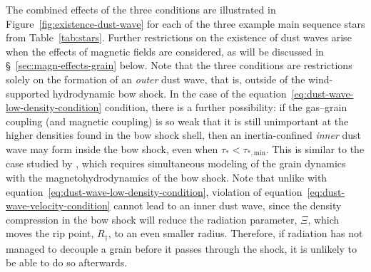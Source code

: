The combined effects of the three conditions are illustrated in
Figure~\ref{fig:existence-dust-wave} for each of the three example
main sequence stars from Table~\ref{tab:stars}.  Further restrictions
on the existence of dust waves arise when the effects of magnetic
fields are considered, as will be discussed in
\S~\ref{sec:magn-effects-grain} below.  Note that the three conditions
are restrictions solely on the formation of an \textit{outer} dust
wave, that is, outside of the wind-supported hydrodynamic bow shock.
In the case of the equation~\eqref{eq:dust-wave-low-density-condition}
condition, there is a further possibility: if the gas--grain coupling
(and magnetic coupling) is so weak that it is still unimportant at the
higher densities found in the bow shock shell, then an
inertia-confined \textit{inner} dust wave may form inside the bow
shock, even when \(\tau_* < \tau_{*,\text{min}}\).  This is similar to the
case studied by \citet{Katushkina:2017a, Katushkina:2018a}, which
requires simultaneous modeling of the grain dynamics with the
magnetohydrodynamics of the bow shock.  Note that unlike with
equation~\eqref{eq:dust-wave-low-density-condition}, violation of
equation~\eqref{eq:dust-wave-velocity-condition} cannot lead to an
inner dust wave, since the density compression in the bow shock will
reduce the radiation parameter, \(\Xi\), which moves the rip point,
\(R_\dag\), to an even smaller radius.  Therefore, if radiation has not
managed to decouple a grain before it passes through the shock, it is
unlikely to be able to do so afterwards.

